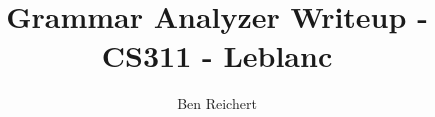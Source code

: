 \documentclass{article}
\begin{document}
\title{Grammar Analyzer Writeup - CS311 - Leblanc}
\author{Ben Reichert}

\maketitle




\end{document}
